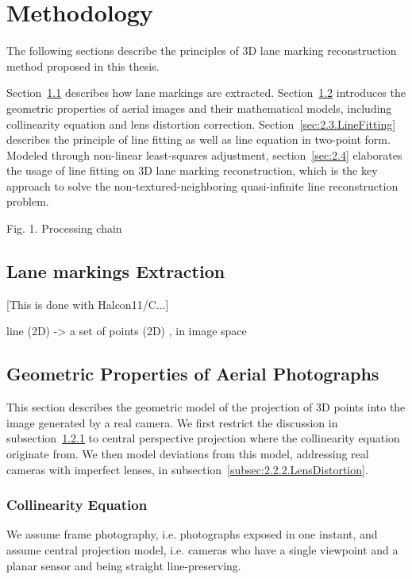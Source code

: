 
\chapter{Methodology}
\label{chap:k2}

The following sections describe the principles of 3D lane marking reconstruction method proposed in this thesis. 

Section~\ref{sec:2.1.LineExtraction} describes how lane markings are extracted.
Section~\ref{sec:2.2.Geometry} introduces the geometric properties of aerial images and their mathematical models, including collinearity equation and lens distortion correction. 
Section~\ref{sec:2.3.LineFitting} describes the principle of line fitting as well as line equation in two-point form.
Modeled through non-linear least-squares adjustment, section~\ref{sec:2.4} elaborates the usage of line fitting on 3D lane marking reconstruction, which is the key approach to solve the non-textured-neighboring quasi-infinite line reconstruction problem.




Fig. 1. Processing chain


\section{Lane markings Extraction}
\label{sec:2.1.LineExtraction}
[This is done with Halcon11/C...]

line (2D) -> a set of points (2D) , in image space

\section{Geometric Properties of Aerial Photographs}
\label{sec:2.2.Geometry}

This section describes the geometric model of the projection of 3D points into the image generated by a real camera. We first restrict the discussion in subsection~\ref{subsec:2.2.1.Collinearity} to central perspective projection where the collinearity equation originate from. We then model deviations from this model, addressing real cameras with imperfect lenses, in subsection~\ref{subsec:2.2.2.LensDistortion}.

\subsection{Collinearity Equation}
\label{subsec:2.2.1.Collinearity}
We assume frame photography, i.e. photographs exposed in one instant, and assume central projection model, i.e. cameras who have a single viewpoint and a planar sensor and being straight line-preserving.

